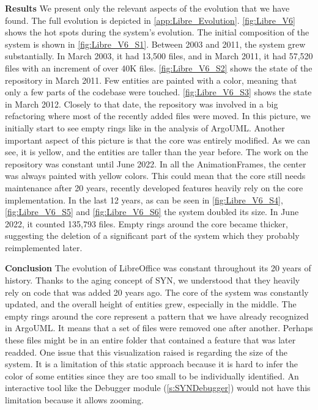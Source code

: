 \textbf{Results}
We present only the relevant aspects of the evolution that we have found. The full evolution is depicted in \autoref{app:Libre_Evolution}. \autoref{fig:Libre_V6} shows the hot spots during the system's evolution. The initial composition of the system is shown in \autoref{fig:Libre_V6_S1}. Between 2003 and 2011, the system 
grew substantially. In March 2003, it had 13,500 files, and in March 2011, it had 57,520 files with an increment of over 40K files. \autoref{fig:Libre_V6_S2} shows the state of the repository in March 2011. Few entities are painted with a color, meaning that only a few parts of the codebase were touched. \autoref{fig:Libre_V6_S3} shows the state in March 2012. Closely to that date, the repository was involved in a big refactoring where most of the recently added files were moved. In this picture, we initially start to see empty rings like in the analysis of ArgoUML. Another important aspect of this picture is that the core was entirely modified. As we can see, it is yellow, and the entities are taller than the year before. The work on the repository was constant until June 2022. In all the AnimationFrames, the center was always painted with yellow colors. This could mean that the core still needs maintenance after 20 years, recently developed features heavily rely on the core implementation. In the last 12 years, as can be seen in \autoref{fig:Libre_V6_S4}, \autoref{fig:Libre_V6_S5} and \autoref{fig:Libre_V6_S6} the system doubled its size. In June 2022, it counted 135,793 files. Empty rings around the core became thicker, suggesting the deletion of a significant part of the system which they probably reimplemented later.

\bigbreak
\textbf{Conclusion} The evolution of LibreOffice was constant throughout its 20 years of history. 
Thanks to the aging concept of SYN, we understood that they heavily rely on code that was added 20 years ago. The core of the system was constantly updated, and the overall height of entities grew, especially in the middle. The empty rings around the core represent a pattern that we have already recognized in ArgoUML. It means that a set of files were removed one after another. Perhaps these files might be in an entire folder that contained a feature that was later readded. One issue that this visualization raised is regarding the size of the system. It is a limitation of this static approach because it is hard to infer the color of some entities since they are too small to be individually identified. An interactive tool like the Debugger module (\autoref{s:SYNDebugger}) would not have this limitation because it allows zooming. 


